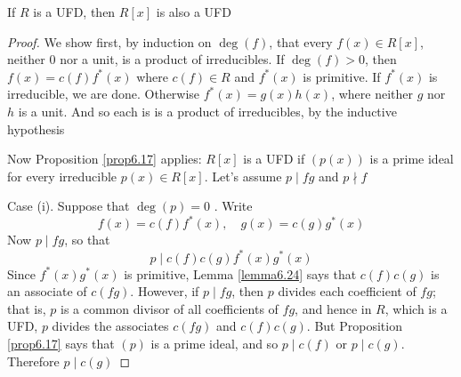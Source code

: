\documentclass[11pt]{article}
\begin{document}
\begin{theorem}[Gauss]
If \(R\) is a UFD, then \(R[x]\) is also a UFD
\end{theorem}

\begin{proof}
We show first, by induction on \(\deg(f)\), that every \(f(x)\in R[x]\),
neither 0 nor a unit, is a product of irreducibles. If \(\deg(f)>0\), then 
\(f(x)=c(f)f^*(x)\) where \(c(f)\in R\) and \(f^*(x)\) is primitive. If
\(f^*(x)\) is irreducible, we are done. Otherwise \(f^*(x)=g(x)h(x)\), where
neither \(g\) nor \(h\) is a unit. And so each is is a product of irreducibles,
by the inductive hypothesis

Now Proposition \ref{prop6.17} applies: \(R[x]\) is a UFD if \((p(x))\) is a
prime ideal for every irreducible \(p(x)\in R[x]\). Let's assume 
\(p\mid fg\) and \(p\nmid f\)

Case (i). Suppose that \(\deg(p)=0\) . Write
\begin{equation*}
f(x)=c(f)f^*(x),\quad g(x)=c(g)g^*(x)
\end{equation*}
Now \(p\mid fg\), so that
\begin{equation*}
p\mid c(f)c(g)f^*(x)g^*(x)
\end{equation*}
Since \(f^*(x)g^*(x)\) is primitive, Lemma \ref{lemma6.24} says that
\(c(f)c(g)\) is an associate of \(c(fg)\). However, if \(p\mid fg\), then \(p\)
divides each coefficient of \(fg\); that is, \(p\) is a common divisor of all
coefficients of \(fg\), and hence in \(R\), which is a UFD, \(p\) divides the
associates \(c(fg)\) and \(c(f)c(g)\). But Proposition \ref{prop6.17} says that
\((p)\) is a prime ideal, and so \(p\mid c(f)\) or \(p\mid c(g)\). Therefore
\(p\mid c(g)\)


\end{proof}
\end{document}
